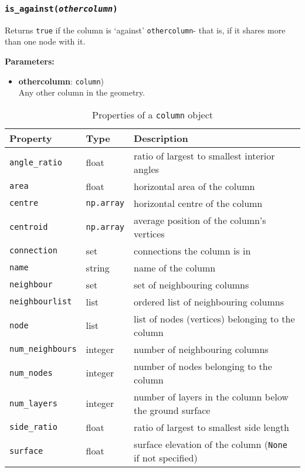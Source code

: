 \subsubsection{\texttt{is\_against(\emph{othercolumn})}}

Returns \texttt{true} if the column is `against' \texttt{othercolumn}- that is, if it shares more than one node with it.

\textbf{Parameters:}
\begin{itemize}
\item \textbf{othercolumn}: \texttt{column})\\
  Any other column in the geometry.
\end{itemize}

\begin{table}
  \begin{center}
    \begin{tabular}{|l|l|l|}
      \hline
      \textbf{Property} & \textbf{Type} & \textbf{Description}\\
      \hline
      \texttt{angle\_ratio} & float & ratio of largest to smallest interior angles \\
      \texttt{area} & float & horizontal area of the column \\
      \texttt{centre} & \texttt{np.array} & horizontal centre of the column \\
      \texttt{centroid} & \texttt{np.array} & average position of the column's vertices \\
      \texttt{connection} & set & connections the column is in \\
      \texttt{name} & string & name of the column \\
      \texttt{neighbour} & set & set of neighbouring columns \\
      \texttt{neighbourlist} & list & ordered list of neighbouring columns \\
      \texttt{node} & list & list of nodes (vertices) belonging to the column \\
      \texttt{num\_neighbours} & integer & number of neighbouring columns \\
      \texttt{num\_nodes} & integer & number of nodes belonging to the column \\
      \texttt{num\_layers} & integer & number of layers in the column below the ground surface \\
      \texttt{side\_ratio} & float & ratio of largest to smallest side length \\
      \texttt{surface} & float & surface elevation of the column (\texttt{None} if not specified)\\
      \hline
    \end{tabular}
    \caption{Properties of a \texttt{column} object}
    \label{tb:column_properties}
  \end{center}
\end{table}

